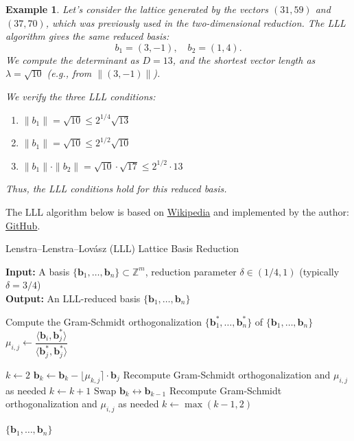 \documentclass[a4paper,12pt]{article}
\newtheorem*{example}{Example}
\begin{document}
\begin{example}
Let's consider the lattice generated by the vectors $(31, 59)$ and $(37, 70)$, which was previously used in the two-dimensional reduction. The \textit{LLL} algorithm gives the same reduced basis:
\[
    b_1 = (3, -1), \quad b_2 = (1, 4).
\]
We compute the determinant as $D = 13$, and the shortest vector length as $\lambda = \sqrt{10}$ (e.g., from $\| (3, -1) \|$).

We verify the three LLL conditions:

\begin{enumerate}
    \item $\|b_1\| = \sqrt{10} \leq 2^{1/4} \sqrt{13}$
    \item $\|b_1\| = \sqrt{10} \leq 2^{1/2} \sqrt{10}$
    \item $\|b_1\| \cdot \|b_2\| = \sqrt{10} \cdot \sqrt{17} \leq 2^{1/2} \cdot 13$
\end{enumerate}

Thus, the LLL conditions hold for this reduced basis.
\end{example}


The LLL algorithm below is based on \href{https://en.wikipedia.org/wiki/Lenstra%E2%80%93Lenstra%E2%80%93Lov%C3%A1sz_lattice_basis_reduction_algorithm}{Wikipedia} and implemented by the author: \href{https://github.com/SanyaKor/Cryptanalysis/blob/main/lattice_methods/lll.py}{GitHub}.

\begin{algorithm}[H]
\caption{Lenstra–Lenstra–Lovász (LLL) Lattice Basis Reduction}
\textbf{Input:} A basis $\{\mathbf{b}_1, \ldots, \mathbf{b}_n\} \subset \mathbb{Z}^m$, reduction parameter $\delta \in (1/4, 1)$ (typically $\delta = 3/4$) \\
\textbf{Output:} An LLL-reduced basis $\{\mathbf{b}_1, \ldots, \mathbf{b}_n\}$

\begin{algorithmic}[1]
\State Compute the Gram-Schmidt orthogonalization $\{\mathbf{b}_1^*, \ldots, \mathbf{b}_n^*\}$ of $\{\mathbf{b}_1, \ldots, \mathbf{b}_n\}$
    \State $\mu_{i,j} \gets \dfrac{\langle \mathbf{b}_i, \mathbf{b}_j^* \rangle}{\langle \mathbf{b}_j^*, \mathbf{b}_j^* \rangle}$
  \EndFor
\EndFor

\State $k \gets 2$
      \State $\mathbf{b}_k \gets \mathbf{b}_k - \lfloor \mu_{k,j} \rceil \cdot \mathbf{b}_j$
      \State Recompute Gram-Schmidt orthogonalization and $\mu_{i,j}$ as needed
    \EndIf
  \EndFor
    \State $k \gets k + 1$
  \Else
    \State Swap $\mathbf{b}_k \leftrightarrow \mathbf{b}_{k-1}$
    \State Recompute Gram-Schmidt orthogonalization and $\mu_{i,j}$ as needed
    \State $k \gets \max(k - 1, 2)$
  \EndIf
\EndWhile

\State \Return $\{\mathbf{b}_1, \ldots, \mathbf{b}_n\}$ 
\end{algorithmic}
\end{algorithm}
\end{document}
